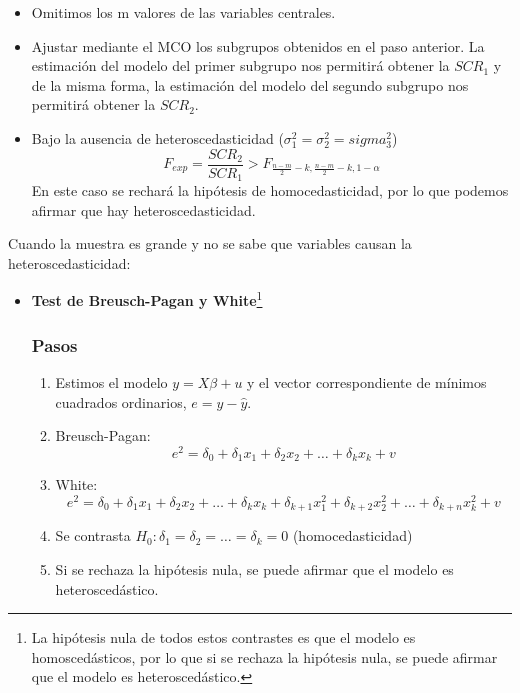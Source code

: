 \documentclass[a4paper,12pt]{article}
\newcommand{\ecuacion}[1]{\ensuremath{#1}}
\begin{document}
\begin{itemize}
\begin{itemize}
        \item Omitimos los m valores de las variables centrales.
        \item Ajustar mediante el MCO los subgrupos obtenidos en el paso anterior. La estimación del modelo del primer subgrupo nos permitirá obtener la \ecuacion{SCR_1} y de la misma forma, la estimación del modelo del segundo subgrupo nos permitirá obtener la \ecuacion{SCR_2}.
        \item Bajo la ausencia de heteroscedasticidad (\ecuacion{\sigma_1^2 = \sigma_2^2 = sigma_3^2})
        \begin{equation}
            F_{exp} = \frac{SCR_2}{SCR_1} > F_{\frac{n-m}{2}-k, \frac{n-m}{2}-k, 1-\alpha}
        \end{equation}
        En este caso se rechará la hipótesis de homocedasticidad, por lo que podemos afirmar que hay heteroscedasticidad.
    \end{itemize}
\end{itemize}
Cuando la muestra es grande y no se sabe que variables causan la heteroscedasticidad:

\begin{itemize}
    \item \textbf{Test de Breusch-Pagan y White}\footnote{La hipótesis nula de todos estos contrastes es que el modelo es homoscedásticos, por lo que si se rechaza la hipótesis nula, se puede afirmar que el modelo es heteroscedástico.}
    \subsubsection*{Pasos}
    \begin{enumerate}
        \item Estimos el modelo \ecuacion{ y =X\beta + u} y el vector correspondiente de mínimos cuadrados ordinarios, \ecuacion{e = y - \hat{y}}.
        \item Breusch-Pagan:
        \begin{equation}
            e^2 = \delta_0 + \delta_1 x_1 + \delta_2 x_2 + \ldots + \delta_k x_k + v
        \end{equation}
        \item White:
        \begin{equation}
            e^2 = \delta_0 + \delta_1 x_1 + \delta_2 x_2 + \ldots + \delta_k x_k + \delta_{k+1} x_1^2 + \delta_{k+2} x_2^2 + \ldots + \delta_{k+n} x_k^2 + v
        \end{equation}
        \item Se contrasta \ecuacion{H_0 : \delta_1 = \delta_2 = \ldots = \delta_k = 0} (homocedasticidad)
        \item Si se rechaza la hipótesis nula, se puede afirmar que el modelo es heteroscedástico.
    \end{enumerate}
    
\end{itemize}
\end{document}
